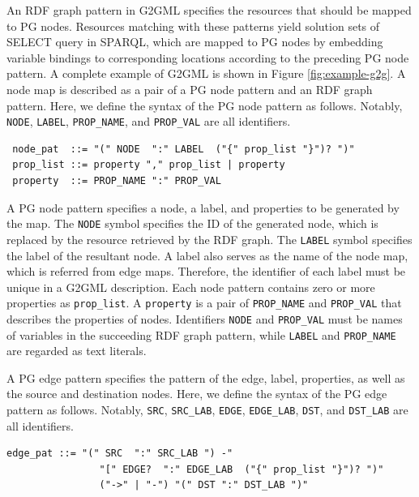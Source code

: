 \documentclass[runningheads]{llncs}
\begin{document}
An RDF graph pattern in G2GML specifies the resources that should be mapped to PG nodes. Resources matching with these patterns yield solution sets of SELECT query in SPARQL, which are mapped to PG nodes by embedding variable bindings to corresponding locations according to the preceding PG node pattern.
A complete example of G2GML is shown in Figure \ref{fig:example-g2g}.
A node map is described as a pair of a PG node pattern and an RDF graph pattern. Here, we define the syntax of the PG node pattern as follows. Notably, \texttt{NODE}, \texttt{LABEL}, \texttt{PROP\_NAME}, and \texttt{PROP\_VAL} are all identifiers.
\begin{defi}
\leavevmode
\begin{verbatim}
 node_pat  ::= "(" NODE  ":" LABEL  ("{" prop_list "}")? ")"
 prop_list ::= property "," prop_list | property
 property  ::= PROP_NAME ":" PROP_VAL
\end{verbatim}
\end{defi}

A PG node pattern specifies a node, a label, and properties to be generated by the map. The \texttt{NODE} symbol specifies the ID of the generated node, which is replaced by the resource retrieved by the RDF graph. The \texttt{LABEL} symbol specifies the label of the resultant node. A label also serves as the name of the node map, which is referred from edge maps.
Therefore, the identifier of each label must be unique in a G2GML description.
Each node pattern contains zero or more properties as \texttt{prop\_list}.
A \texttt{property} is a pair of \texttt{PROP\_NAME} and \texttt{PROP\_VAL} that describes the properties of nodes.
Identifiers \texttt{NODE} and \texttt{PROP\_VAL} must be names of variables in the succeeding RDF graph pattern, while \texttt{LABEL} and \texttt{PROP\_NAME} are regarded as text literals.
 
A PG edge pattern specifies the pattern of the edge, label, properties, as well as the source and destination nodes.
Here, we define the syntax of the PG edge pattern as follows.
Notably, \texttt{SRC}, \texttt{SRC\_LAB}, \texttt{EDGE}, \texttt{EDGE\_LAB}, \texttt{DST}, and \texttt{DST\_LAB} are all identifiers.
\begin{defi}
\leavevmode
\begin{verbatim}
edge_pat ::= "(" SRC  ":" SRC_LAB ") -" 
                "[" EDGE?  ":" EDGE_LAB  ("{" prop_list "}")? ")" 
                ("->" | "-") "(" DST ":" DST_LAB ")"
\end{verbatim}
\end{defi}
\end{document}
